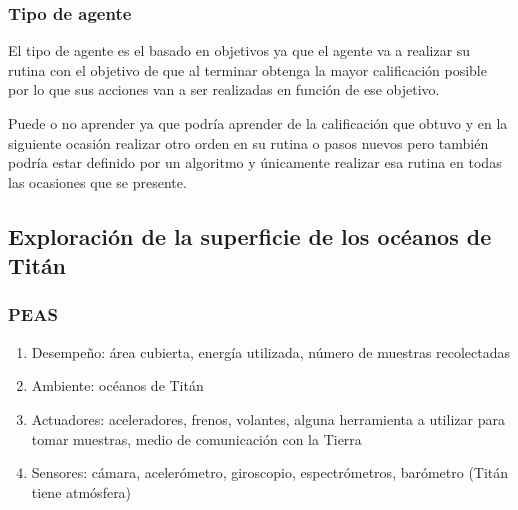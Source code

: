 \documentclass{article}
\begin{document}
            \subsubsection{Tipo de agente}
                El tipo de agente es el basado en objetivos ya que el agente va a realizar su rutina con el objetivo de que al terminar obtenga la mayor calificación posible por lo que sus acciones van a ser realizadas en función de ese objetivo.
                
                Puede o no aprender ya que podría aprender de la calificación que obtuvo y en la siguiente ocasión realizar otro orden en su rutina o pasos nuevos pero también podría estar definido por un algoritmo y únicamente realizar esa rutina en todas las ocasiones que se presente.

        \subsection{Exploración de la superficie de los océanos de Titán}

            \subsubsection{PEAS}
                \begin{enumerate}
                    \item Desempeño: área cubierta, energía utilizada, número de muestras recolectadas
                    \item Ambiente: océanos de Titán
                    \item Actuadores: aceleradores, frenos, volantes, alguna herramienta a utilizar para tomar muestras, medio de comunicación con la Tierra
                    \item Sensores: cámara, acelerómetro, giroscopio, espectrómetros, barómetro (Titán tiene atmósfera)
            \end{enumerate}
\end{document}
